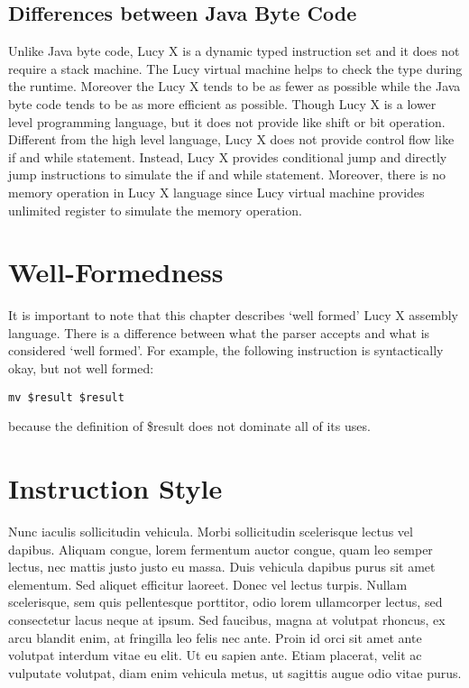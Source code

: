 \subsection{Differences between Java Byte Code}
Unlike Java byte code, Lucy X is a dynamic typed instruction set and it does not require a stack machine. The Lucy virtual machine helps to check the type during the runtime. Moreover the Lucy X tends to be as fewer as possible while the Java byte code tends to be as more efficient as possible. Though Lucy X is a lower level programming language, but it does not provide like shift or bit operation. Different from the high level language, Lucy X does not provide control flow like if and while statement. Instead, Lucy X provides conditional jump and directly jump instructions to simulate the if and while statement. Moreover, there is no memory operation in Lucy X language since Lucy virtual machine provides unlimited register to simulate the memory operation.


\section{Well-Formedness}
It is important to note that this chapter describes ‘well formed’ Lucy X assembly language. There is a difference between what the parser accepts and what is considered ‘well formed’. For example, the following instruction is syntactically okay, but not well formed:
\begin{lstlisting}[language=LucyX]
mv $result $result
\end{lstlisting}
because the definition of \$result does not dominate all of its uses.


\section{Instruction Style}
Nunc iaculis sollicitudin vehicula. Morbi sollicitudin scelerisque lectus vel dapibus. Aliquam congue, lorem fermentum auctor congue, quam leo semper lectus, nec mattis justo justo eu massa. Duis vehicula dapibus purus sit amet elementum. Sed aliquet efficitur laoreet. Donec vel lectus turpis. Nullam scelerisque, sem quis pellentesque porttitor, odio lorem ullamcorper lectus, sed consectetur lacus neque at ipsum. Sed faucibus, magna at volutpat rhoncus, ex arcu blandit enim, at fringilla leo felis nec ante. Proin id orci sit amet ante volutpat interdum vitae eu elit. Ut eu sapien ante. Etiam placerat, velit ac vulputate volutpat, diam enim vehicula metus, ut sagittis augue odio vitae purus.


